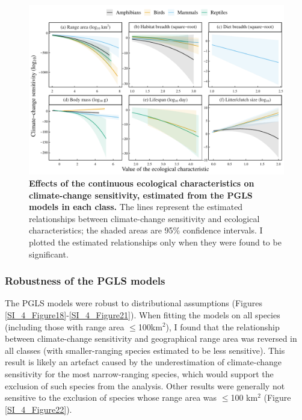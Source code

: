 \clearpage
\begin{figure}[h!]
\centering
\includegraphics[scale=0.7]{figures/Chapter4/Figure6}
\caption[Effects of the continuous ecological characteristics on climate-change sensitivity, estimated from the PGLS models in each class.]{\textbf{Effects of the continuous ecological characteristics on climate-change sensitivity, estimated from the PGLS models in each class.} The lines represent the estimated relationships between climate-change sensitivity and ecological characteristics; the shaded areas are 95\% confidence intervals. I plotted the estimated relationships only when they were found to be significant.}
\label{chap4_fig6}
\end{figure}

\subsubsection{Robustness of the PGLS models}
The PGLS models were robust to distributional assumptions (Figures \ref{SI_4_Figure18}-\ref{SI_4_Figure21}). When fitting the models on all species (including those with range area $\leq$100km$^2$), I found that the relationship between climate-change sensitivity and geographical range area was reversed in all classes (with smaller-ranging species estimated to be less sensitive). This result is likely an artefact caused by the underestimation of climate-change sensitivity for the most narrow-ranging species, which would support the exclusion of such species from the analysis. Other results were generally not sensitive to the exclusion of species whose range area was $\leq$100 km$^2$ (Figure \ref{SI_4_Figure22}).

